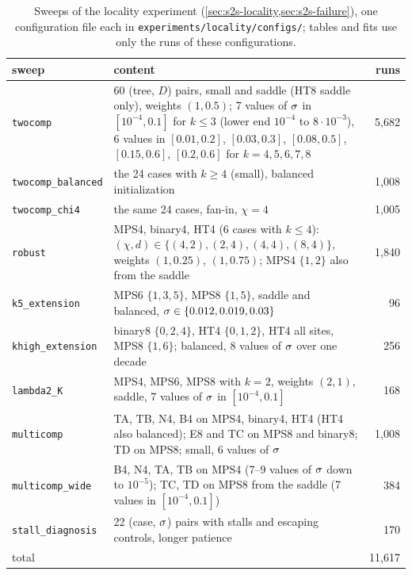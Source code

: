 \begin{table}[ht]
  \centering
  \caption{Sweeps of the locality experiment (\cref{sec:s2s-locality,sec:s2s-failure}), one
    configuration file each in \texttt{experiments/locality/configs/}; tables and fits use only the
    runs of these configurations.}
  \label{tab:exp-locality}
  \footnotesize
  \begin{tabularx}{\textwidth}{@{}>{\raggedright\arraybackslash}p{2.9cm}X r@{}}
    \toprule
    sweep & content & runs \\
    \midrule
    \texttt{twocomp} & 60 (tree, $D$) pairs, small and saddle (HT8 saddle only), weights $(1,0.5)$;
      7 values of $\sigma$ in $[10^{-4},0.1]$ for $k\le3$ (lower end $10^{-4}$ to $8\cdot10^{-3}$), 6 values
      in $[0.01,0.2]$, $[0.03,0.3]$, $[0.08,0.5]$, $[0.15,0.6]$, $[0.2,0.6]$ for $k=4,5,6,7,8$ & 5,682 \\
    \texttt{twocomp\_balanced} & the 24 cases with $k\ge4$ (small), balanced initialization & 1,008 \\
    \texttt{twocomp\_chi4} & the same 24 cases, fan-in, $\chi=4$ & 1,005 \\
    \texttt{robust} & MPS4, binary4, HT4 (6 cases with $k\le4$): $(\chi,d)\in\{(4,2),(2,4),(4,4),(8,4)\}$,
      weights $(1,0.25)$, $(1,0.75)$; MPS4 $\{1,2\}$ also from the saddle & 1,840 \\
    \texttt{k5\_extension} & MPS6 $\{1,3,5\}$, MPS8 $\{1,5\}$, saddle and balanced,
      $\sigma\in\{0.012,0.019,0.03\}$ & 96 \\
    \texttt{khigh\_extension} & binary8 $\{0,2,4\}$, HT4 $\{0,1,2\}$, HT4 all sites, MPS8 $\{1,6\}$;
      balanced, 8 values of $\sigma$ over one decade & 256 \\
    \texttt{lambda2\_K} & MPS4, MPS6, MPS8 with $k=2$, weights $(2,1)$, saddle, 7 values of $\sigma$ in
      $[10^{-4},0.1]$ & 168 \\
    \texttt{multicomp} & TA, TB, N4, B4 on MPS4, binary4, HT4 (HT4 also balanced); E8 and TC on MPS8 and
      binary8; TD on MPS8; small, 6 values of $\sigma$ & 1,008 \\
    \texttt{multicomp\_wide} & B4, N4, TA, TB on MPS4 (7--9 values of $\sigma$ down to $10^{-5}$); TC, TD on
      MPS8 from the saddle (7 values in $[10^{-4},0.1]$) & 384 \\
    \texttt{stall\_diagnosis} & 22 (case, $\sigma$) pairs with stalls and escaping controls, longer patience
      & 170 \\
    \midrule
    total & & 11,617 \\
    \bottomrule
  \end{tabularx}
\end{table}

